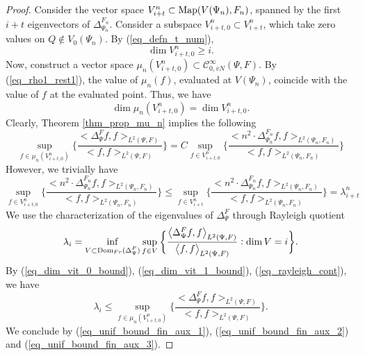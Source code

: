 \documentclass[12pt]{article}
\numberwithin{equation}{section}
\theoremstyle{theorem}
\theoremstyle{definition}
\theoremstyle{remark}
\newcommand{\ccal}{\mathscr{C}}
\newcommand{\laplcomp}{\Delta}
\newcommand{\scal}[2]{\big< #1, #2 \big>}
\begin{document}
	\begin{proof}
		Consider the vector space $V_{i + t}^{n} \subset {\rm{Map}}(V(\Psi_n), F_n)$, spanned by the first $i + t$ eigenvectors of $\laplcomp_{\Psi_n}^{F_n}$.
		Consider a subspace $V_{i + t, 0}^{n} \subset V_{i + t}^{n}$, which take zero values on $Q \notin V_0(\Psi_n)$.
		By (\ref{eq_defn_t_num}),
		\begin{equation}\label{eq_dim_vit_0_bound}
			\dim V_{i + t, 0}^{n} \geq i.
		\end{equation}
		Now, construct a vector space $\mu_n(V_{i + t, 0}^{n}) \subset \ccal^{\infty}_{0, vN}(\Psi, F)$. 
		By (\ref{eq_rho1_rest1}), the value of $\mu_n(f)$, evaluated at $V(\Psi_n)$, coincide with the value of $f$ at the evaluated point.
		Thus, we have
		\begin{equation}\label{eq_dim_vit_1_bound}
			\dim \mu_n(V_{i + t, 0}^{n}) = \dim V_{i + t, 0}^{n}.
		\end{equation}
		Clearly, Theorem \ref{thm_prop_mu_n} implies the following
		\begin{equation}\label{eq_unif_bound_fin_aux_1}
			\sup_{f \in \mu_n(V_{i + t, 0}^{n})} 
			\bigg\{ 
				\frac{\scal{\laplcomp_{\Psi}^{F} f}{f}_{L^2(\Psi, F)}}{\scal{f}{f}_{L^2(\Psi, F)}}
			\bigg\}
			=
			C 
			\sup_{f \in V_{i + t, 0}^{n}} 
			\bigg\{ 
				\frac{\scal{n^2 \cdot \laplcomp_{\Psi_n}^{F_n} f}{f}_{L^2(\Psi_n, F_n)}}{\scal{f}{f}_{L^2(\Psi_n, F_n)}}
			\bigg\}
		\end{equation}
		However, we trivially have
		\begin{equation}\label{eq_unif_bound_fin_aux_2}
			\sup_{f \in V_{i + t, 0}^{n}} 
			\bigg\{ 
				\frac{\scal{n^2 \cdot \laplcomp_{\Psi_n}^{F_n} f}{f}_{L^2(\Psi_n, F_n)}}{\scal{f}{f}_{L^2(\Psi_n, F_n)}}
			\bigg\}
			\leq 
			\sup_{f \in V_{i + t}^{n}} 
			\bigg\{ 
				\frac{\scal{n^2 \cdot \laplcomp_{\Psi_n}^{F_n} f}{f}_{L^2(\Psi_n, F_n)}}{\scal{f}{f}_{L^2(\Psi_n, F_n)}}
			\bigg\}
			=
			\lambda_{i + t}^{n}
		\end{equation}
		We use the characterization of the eigenvalues of $\laplcomp_{\Psi}^{F}$ through Rayleigh quotient
		\begin{equation}\label{eq_rayleigh_cont}
			\lambda_{i} = \inf_{\substack{V \subset {\rm{Dom}}_{Fr}(\laplcomp_{\Psi}^{F}) } }  \sup_{f \in V} 
			\bigg\{ 
				\frac{\scal{\laplcomp_{\Psi}^{F} f}{f}_{L^2(\Psi, F)}}{\scal{f}{f}_{L^2(\Psi, F)}}
				 : \dim V = i			
			\bigg\}.
		\end{equation}
		By (\ref{eq_dim_vit_0_bound}), (\ref{eq_dim_vit_1_bound}), (\ref{eq_rayleigh_cont}), we have
		\begin{equation}\label{eq_unif_bound_fin_aux_3}
			\lambda_i 
			\leq 
			\sup_{f \in \mu_n(V_{i + t, 0}^{n})} 
			\bigg\{ 
				\frac{\scal{\laplcomp_{\Psi}^{F} f}{f}_{L^2(\Psi, F)}}{\scal{f}{f}_{L^2(\Psi, F)}}
			\bigg\}.
		\end{equation}
		We conclude by (\ref{eq_unif_bound_fin_aux_1}), (\ref{eq_unif_bound_fin_aux_2}) and (\ref{eq_unif_bound_fin_aux_3}).
	\end{proof}
\end{document}
